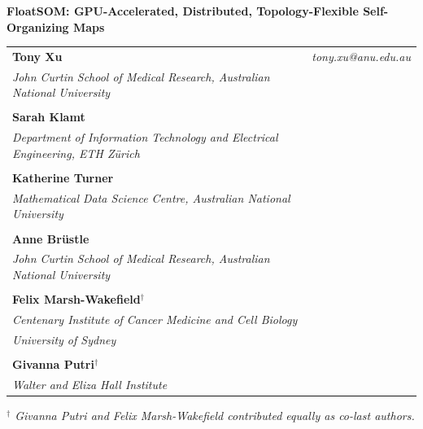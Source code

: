 \documentclass[11pt]{article}
\begin{document}
\begin{center}
{\LARGE\bfseries FloatSOM: GPU-Accelerated, Distributed, Topology-Flexible Self-Organizing Maps\par}
\end{center}

\vspace{1.8em}

\noindent
\begin{tabular*}{\textwidth}{@{\extracolsep{\fill}} l r}
\textbf{Tony Xu} & \textit{tony.xu@anu.edu.au} \\
\textit{John Curtin School of Medical Research, Australian National University} & \\
\\[0.8em]
\textbf{Sarah Klamt} & \\
\textit{Department of Information Technology and Electrical Engineering, ETH Zürich} & \\
\\[0.8em]
\textbf{Katherine Turner} & \\
\textit{Mathematical Data Science Centre, Australian National University} & \\
\\[0.8em]
\textbf{Anne Brüstle} & \\
\textit{John Curtin School of Medical Research, Australian National University} & \\
\\[0.8em]
\textbf{Felix Marsh-Wakefield$^\dagger$} & \\
\textit{Centenary Institute of Cancer Medicine and Cell Biology} & \\
\textit{University of Sydney} & \\
\\[0.8em]
\textbf{Givanna Putri$^\dagger$} & \\
\textit{Walter and Eliza Hall Institute} & \\
\end{tabular*}

\vspace{0.8em}

\noindent\textit{$^\dagger$ Givanna Putri and Felix Marsh-Wakefield contributed equally as co-last authors.}

\vspace{1.4em}
\end{document}
